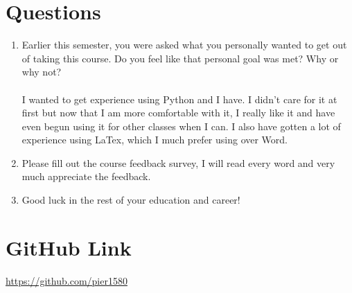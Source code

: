 \section{Questions}
\begin{enumerate}
\item 
Earlier this semester, you were asked what you personally wanted to get out of taking this
course. Do you feel like that personal goal was met? Why or why not?
\paragraph{}
I wanted to get experience using Python and I have.  I didn't care for it at first but now that I am more comfortable with it, I really like it and have even begun using it for other classes when I can.  I also have gotten a lot of experience using LaTex, which I much prefer using over Word.\\ 

\item
Please fill out the course feedback survey, I will read every word and very much appreciate
the feedback.

\item
Good luck in the rest of your education and career!

\end{enumerate}
\section{GitHub Link}
\url{https://github.com/pier1580}

%
%




